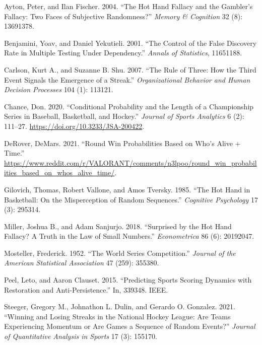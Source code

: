 \documentclass{article}
\newlength{\cslhangindent}
\newlength{\cslentryspacingunit} %
\newenvironment{CSLReferences}[2] %
 {%
  \setlength{\parindent}{0pt}
  \ifodd #1
  \let\oldpar\par
  \def\par{\hangindent=\cslhangindent\oldpar}
  \fi
  \setlength{\parskip}{#2\cslentryspacingunit}
 }%
 {}
\begin{document}
\hypertarget{refs}{}
\begin{CSLReferences}{1}{0}
\leavevmode{}%
Ayton, Peter, and Ilan Fischer. 2004. {``The Hot Hand Fallacy and the
Gambler{'}s Fallacy: Two Faces of Subjective Randomness?''} \emph{Memory
\& Cognition} 32 (8): 13691378.

\leavevmode{}%
Benjamini, Yoav, and Daniel Yekutieli. 2001. {``The Control of the False
Discovery Rate in Multiple Testing Under Dependency.''} \emph{Annals of
Statistics}, 11651188.

\leavevmode{}%
Carlson, Kurt A., and Suzanne B. Shu. 2007. {``The Rule of Three: How
the Third Event Signals the Emergence of a Streak.''}
\emph{Organizational Behavior and Human Decision Processes} 104 (1):
113121.

\leavevmode{}%
Chance, Don. 2020. {``Conditional Probability and the Length of a
Championship Series in Baseball, Basketball, and Hockey.''}
\emph{Journal of Sports Analytics} 6 (2): 111--27.
\url{https://doi.org/10.3233/JSA-200422}.

\leavevmode{}%
DeRover, DeMars. 2021. {``Round Win Probabilities Based on Who's Alive +
Time.''}
\url{https://www.reddit.com/r/VALORANT/comments/n3lpoo/round_win_probabilities_based_on_whos_alive_time/}.

\leavevmode{}%
Gilovich, Thomas, Robert Vallone, and Amos Tversky. 1985. {``The Hot
Hand in Basketball: On the Misperception of Random Sequences.''}
\emph{Cognitive Psychology} 17 (3): 295314.

\leavevmode{}%
Miller, Joshua B., and Adam Sanjurjo. 2018. {``Surprised by the Hot Hand
Fallacy? A Truth in the Law of Small Numbers.''} \emph{Econometrica} 86
(6): 20192047.

\leavevmode{}%
Mosteller, Frederick. 1952. {``The World Series Competition.''}
\emph{Journal of the American Statistical Association} 47 (259): 355380.

\leavevmode{}%
Peel, Leto, and Aaron Clauset. 2015. {``Predicting Sports Scoring
Dynamics with Restoration and Anti-Persistence.''} In, 339348. IEEE.

\leavevmode{}%
Steeger, Gregory M., Johnathon L. Dulin, and Gerardo O. Gonzalez. 2021.
{``Winning and Losing Streaks in the National Hockey League: Are Teams
Experiencing Momentum or Are Games a Sequence of Random Events?''}
\emph{Journal of Quantitative Analysis in Sports} 17 (3): 155170.


\end{CSLReferences}
\end{document}

